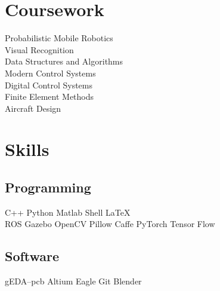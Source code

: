 \documentclass[]{deedy-resume-openfont}
\begin{document}
\begin{minipage}[t]{0.33\textwidth}

\section{Coursework}
Probabilistic Mobile Robotics \\
Visual Recognition \\
Data Structures and Algorithms \\
Modern Control Systems \\
Digital Control Systems \\
Finite Element Methods \\
Aircraft Design
\sectionsep


\section{Skills}
\subsection{Programming}
C++ \textbullet{} Python \textbullet{} Matlab \textbullet{} Shell \textbullet{} \LaTeX\\
ROS \textbullet{} Gazebo \textbullet{} OpenCV \textbullet{} Pillow \textbullet{} Caffe \textbullet{} PyTorch \textbullet{} Tensor Flow\\
\subsection{Software}
gEDA--pcb \textbullet{} Altium \textbullet{} Eagle \textbullet{} Git \textbullet{} Blender

\sectionsep

%
%

\end{minipage} 
\end{document}
